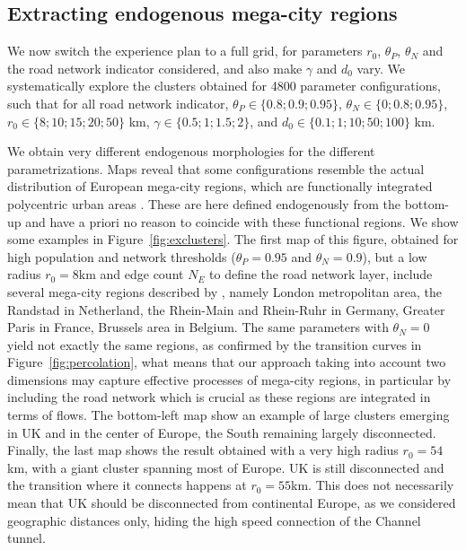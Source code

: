 \documentclass{jimis-en}
\begin{document}
\subsection{Extracting endogenous mega-city regions}


We now switch the experience plan to a full grid, for parameters $r_0$, $\theta_P$, $\theta_N$ and the road network indicator considered, and also make $\gamma$ and $d_0$ vary. We systematically explore the clusters obtained for 4800 parameter configurations, such that for all road network indicator, $\theta_P \in \{ 0.8 ; 0.9 ; 0.95 \}$, $\theta_N \in \{0 ; 0.8 ; 0.95 \}$, $r_0 \in \{ 8 ; 10 ; 15 ; 20 ; 50\}$ km, $\gamma \in \{ 0.5 ; 1 ; 1.5 ; 2\}$, and $d_0 \in \{ 0.1 ; 1 ; 10 ; 50 ; 100\}$ km.


We obtain very different endogenous morphologies for the different parametrizations. Maps reveal that some configurations resemble the actual distribution of European mega-city regions, which are functionally integrated polycentric urban areas \citep{hall2006polycentric}. These are here defined endogenously from the bottom-up and have a priori no reason to coincide with these functional regions. We show some examples in Figure~\ref{fig:exclusters}. The first map of this figure, obtained for high population and network thresholds ($\theta_P = 0.95$ and $\theta_N = 0.9$), but a low radius $r_0 = 8$km and edge count $N_E$ to define the road network layer, include several mega-city regions described by \cite{hall2006polycentric}, namely London metropolitan area, the Randstad in Netherland, the Rhein-Main and Rhein-Ruhr in Germany, Greater Paris in France, Brussels area in Belgium. The same parameters with $\theta_N = 0$ yield not exactly the same regions, as confirmed by the transition curves in Figure~\ref{fig:percolation}, what means that our approach taking into account two dimensions may capture effective processes of mega-city regions, in particular by including the road network which is crucial as these regions are integrated in terms of flows. The bottom-left map show an example of large clusters emerging in UK and in the center of Europe, the South remaining largely disconnected. Finally, the last map shows the result obtained with a very high radius $r_0 = 54$km, with a giant cluster spanning most of Europe. UK is still disconnected and the transition where it connects happens at $r_0 = 55$km. This does not necessarily mean that UK should be disconnected from continental Europe, as we considered geographic distances only, hiding the high speed connection of the Channel tunnel.
\end{document}
